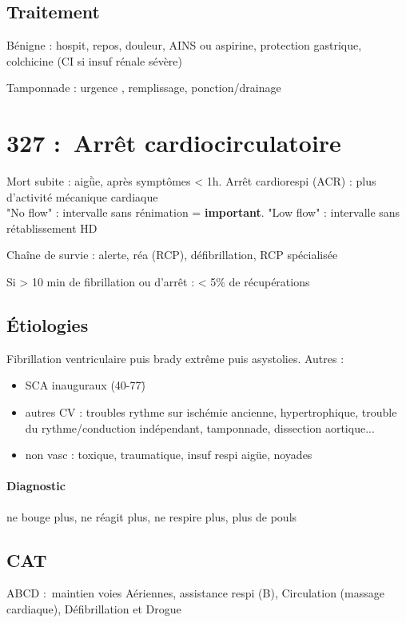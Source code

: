 \documentclass{article}
\begin{document}
\subsection{Traitement}
Bénigne : hospit, repos, douleur, AINS ou aspirine, protection gastrique,
colchicine (CI si insuf rénale sévère)

Tamponnade : urgence \skull, remplissage, ponction/drainage

\section{327 : Arrêt cardiocirculatoire}%
\label{sec:327_arret_cardiocirculatoire}

Mort subite : aigǜe, après symptômes < 1h. Arrêt cardiorespi (ACR) : plus d'activité
mécanique cardiaque\\
"No flow" : intervalle sans rénimation = \textbf{important}. 
"Low flow" : intervalle sans rétablissement HD

Chaîne de survie : alerte, réa (RCP), défibrillation, RCP spécialisée

Si > 10 min de fibrillation ou d'arrêt : < 5\% de récupérations

\subsection{Étiologies}
Fibrillation ventriculaire puis brady extrême puis asystolies.
Autres :
\begin{itemize}
  \item SCA inauguraux (40-77\=)
  \item autres CV : troubles rythme sur ischémie ancienne, hypertrophique,
    trouble du rythme/conduction indépendant, tamponnade, dissection aortique...
  \item non vasc : toxique, traumatique, insuf respi aigüe, noyades
\end{itemize}

\paragraph{Diagnostic} ne bouge plus, ne réagit plus, ne respire plus, plus de
pouls

\subsection{CAT}
ABCD : maintien voies Aériennes, assistance respi (B), Circulation (massage
cardiaque), Défibrillation et Drogue
\end{document}
